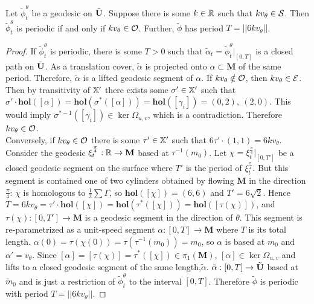 \documentclass[]{article}
\def\hol{\mathbf{hol}}
\def\bM{\mathbf{M}}
\def\tildphi{\tilde{\phi}}
\begin{document}
\begin{thm}
Let $\tildphi_t^\theta$ be a geodesic on $\tilde{\mathbf{U}}$. Suppose there is some $k\in\mathbb{R}$ such that $kv_\theta\in\mathcal{S}$. Then $\tildphi_t^\theta$ is periodic if and only if $kv_\theta\in\mathcal{O}$. Further, $\tildphi$ has period $T=||6kv_\theta||$.
\begin{proof}
If $\tildphi_t^\theta$ is periodic, there is some $T>0$ such that $\tilde{\alpha}_t=\tildphi_t^\theta\vert_{[0,T]}$ is a closed path on $\tilde{\mathbf{U}}$. As a translation cover, $\tilde{\alpha}$ is projected onto $\alpha\subset\bM$ of the same period. Therefore, $\tilde{\alpha}$ is a lifted geodesic segment of $\alpha$. If $kv_\theta\notin\mathcal{O}$, then $kv_\theta\in\mathcal{E}$. Then by transitivity of $\mathbb{X}'$ there exists some $\sigma'\in\mathbb{X}'$ such that $\sigma'\cdot\hol([\alpha])=\hol(\sigma^*([\alpha]))=\hol([\gamma_i])=(0,2),~(2,0)$. This would imply $\sigma^{*-1}([\gamma_i])\in\ker\Omega_{u,v}$, which is a contradiction. Therefore $kv_\theta\in\mathcal{O}$. \\ Conversely, if $kv_\theta\in\mathcal{O}$ there is some $\tau'\in\mathbb{X}'$ such that $6\tau'\cdot(1,1)=6kv_\theta$. Consider the geodesic $\xi_t^{\frac{\pi}{4}}:\RR\rightarrow\bM$ based at $\tau^{-1}(m_0)$. Let $\chi=\xi_t^{\frac{\pi}{4}}\vert_{[0,T']}$ be a closed geodesic segment on the surface where $T'$ is the period of $\xi_t^{\frac{\pi}{4}}$. But this segment is contained one of two cylinders obtained by flowing $\bM$ in the direction $\frac{\pi}{4}$:
$\chi$ is homologous to $\frac{1}{2}\sum\Gamma$, so $\hol([\chi])=(6,6)$ and $T'=6\sqrt{2}$. Hence $T=6kv_\theta=\tau'\cdot\hol([\chi])=\hol(\tau^*([\chi]))=\hol([\tau(\chi)])$, and $\tau(\chi):[0,T']\rightarrow\bM$ is a geodesic segment in the direction of $\theta$. This segment is re-parametrized as a unit-speed segment $\alpha:[0,T]\rightarrow\bM$ where $T$ is its total length. $\alpha(0)=\tau(\chi(0))=\tau(\tau^{-1}(m_0))=m_0$, so $\alpha$ is based at $m_0$ and $\alpha'=v_\theta$. Since $[\alpha]=[\tau(\chi)]=\tau^*([\chi])\in \pi_1(\bM)$, $[\alpha]\in\ker\Omega_{u,v}$ and lifts to a closed geodesic segment of the same length,$\tilde{\alpha}$.  $\tilde{\alpha}:[0,T]\rightarrow\tilde{\mathbf{U}}$ based at $\tilde{m}_0$ and is just a restriction of $\tildphi_t^\theta$ to the interval $[0,T]$. Therefore $\tildphi$ is periodic with period $T=||6kv_\theta||$.
\end{proof}


\end{thm}
\end{document}

